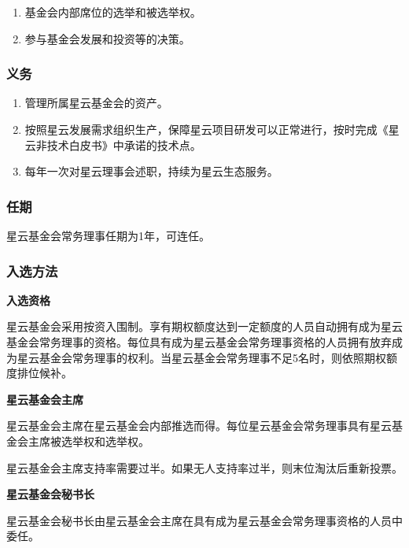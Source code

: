 \begin{enumerate}
	\item 基金会内部席位的选举和被选举权。
	\item 参与基金会发展和投资等的决策。
\end{enumerate}

\subsubsection{义务}

\begin{enumerate}
	\item 管理所属星云基金会的资产。
	\item 按照星云发展需求组织生产，保障星云项目研发可以正常进行，按时完成《星云非技术白皮书》中承诺的技术点。
	\item 每年一次对星云理事会述职，持续为星云生态服务。
\end{enumerate}

\subsubsection{任期}

星云基金会常务理事任期为1年，可连任。

\subsubsection{入选方法}

\textbf{入选资格}

星云基金会采用按资入围制。享有期权额度达到一定额度的人员自动拥有成为星云基金会常务理事的资格。每位具有成为星云基金会常务理事资格的人员拥有放弃成为星云基金会常务理事的权利。当星云基金会常务理事不足5名时，则依照期权额度排位候补。

\vspace{2em}

\textbf{星云基金会主席}

星云基金会主席在星云基金会内部推选而得。每位星云基金会常务理事具有星云基金会主席被选举权和选举权。

星云基金会主席支持率需要过半。如果无人支持率过半，则末位淘汰后重新投票。

\vspace{2em}

\textbf{星云基金会秘书长}

星云基金会秘书长由星云基金会主席在具有成为星云基金会常务理事资格的人员中委任。

\vspace{2em}

